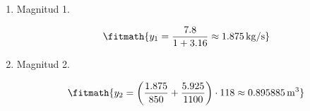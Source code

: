 \begin{enumerate}

\item Magnitud 1.

\[\fitmath{y_{1}=\frac{7.8}{1+3.16}\approx 1.875\,\mathrm{kg/s}}\]

\item Magnitud 2.

\[\fitmath{y_{2}=\left(\frac{1.875}{850}+\frac{5.925}{1100}\right)\cdot 118\approx 0.895885\,\mathrm{m^{3}}}\]

\end{enumerate}

